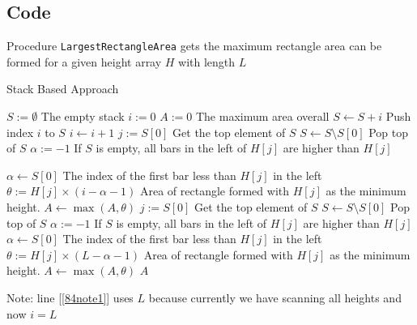 \subsection{Code}
Procedure \texttt{LargestRectangleArea} gets the maximum rectangle area can be formed for a given height array $H$ with length $L$
\setcounter{algorithm}{0}
\begin{algorithm}[H]
\caption{Stack Based Approach}
\label{84MainProc}
\begin{algorithmic}[1]
\State $S:=\emptyset$ \Comment The empty stack
\State $i:=0$
\State $A:=0$ \Comment The maximum area overall
\State $S\gets S+i$ \Comment Push index $i$ to $S$
\State $i\gets i+1$
\Else
\State $j:=S[0]$ \Comment Get the top element of $S$
\State $S\gets S\setminus S[0]$ \Comment Pop top of $S$
\State $\alpha:=-1$ \Comment If $S$ is empty, all bars in the left of $H[j]$ are higher than $H[j]$
\end{algorithmic}
\end{algorithm}
\begin{algorithm}[H]
\begin{algorithmic}[1]
\State $\alpha\gets S[0]$ \Comment  The index of the first bar less than $H[j]$ in the left
\EndIf
\State $\theta:=H[j]\times(i - \alpha - 1)$ \Comment Area of rectangle formed with $H[j]$ as the minimum height.
\State $A\gets \max(A, \theta)$
\EndIf
\EndWhile
{}
\State $j:=S[0]$ \Comment Get the top element of $S$
\State $S\gets S\setminus S[0]$ \Comment Pop top of $S$
\State $\alpha:=-1$ \Comment If $S$ is empty, all bars in the left of $H[j]$ are higher than $H[j]$
\State $\alpha\gets S[0]$ \Comment  The index of the first bar less than $H[j]$ in the left
\EndIf
\State $\theta:=H[j]\times(L - \alpha - 1)$ \Comment Area of rectangle formed with $H[j]$ as the minimum height. \label{84note1}
\State $A\gets \max(A, \theta)$
\EndWhile
\State \Return $A$
\EndProcedure
\end{algorithmic}
\end{algorithm}
Note: line [\ref{84note1}] uses $L$ because currently we have scanning all heights and now $i=L$